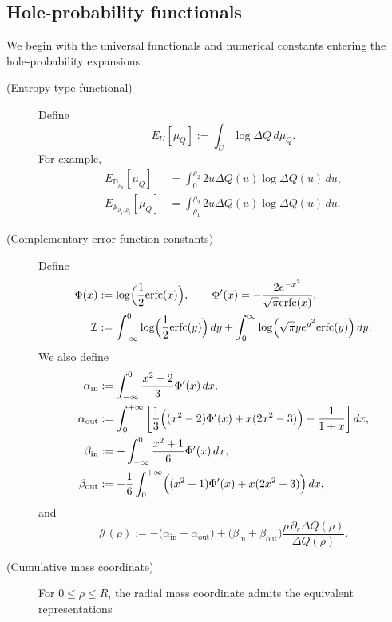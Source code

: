 \documentclass[a4paper]{article}
\newcommand{\erfc}{{\rm erfc}}
\numberwithin{equation}{section}
\begin{document}
\subsection{Hole-probability functionals}
We begin with the universal functionals and numerical constants entering the
hole-probability expansions.
\begin{description}
\item[(Entropy-type functional)] Define
\begin{equation}
    E_{U}[\mu_{Q}]:=\int_{U}\log \Delta Q\,d\mu_{Q}. 
\end{equation}
For example,
\begin{align*}
E_{\mathbb{D}_{\rho_2}}[\mu_Q]&=\int_{0}^{\rho_2}2u\Delta Q(u)\log\Delta Q(u)\,du,\\
E_{\mathbb{A}_{\rho_1,\rho_2}}[\mu_Q]&=\int_{\rho_1}^{\rho_2}2u\Delta Q(u)\log\Delta Q(u)\,du.
\end{align*}
\item[(Complementary-error-function constants)] Define
\begin{align}
    \Phi(x)&:=\log\Bigl(\frac{1}{2}\erfc(x)\Bigr),\qquad
    \Phi'(x)=-\frac{2e^{-x^2}}{\sqrt{\pi}\erfc(x)},
    \\
\mathcal{I}&:=
\int_{-\infty}^0 \log\Bigl( 
\frac{1}{2}\mathrm{erfc}(y)
\Bigr)\,dy
+
\int_{0}^{\infty}
\log\Bigl( 
\sqrt{\pi}ye^{y^2}\mathrm{erfc}(y)
\Bigr) \,dy.
\end{align}
We also define    
\begin{align}
\alpha_{\mathrm{in}}&:=\int_{-\infty}^{0}\frac{x^2-2}{3}\Phi'(x)\,dx, 
\\
\alpha_{\mathrm{out}}&:=\int_{0}^{+\infty}\bigg[
\frac{1}{3}\Bigl( 
(x^2-2)\Phi'(x)+x(2x^2-3)
\Bigr)-\frac{1}{1+x}
\bigg]\,dx, 
\\
\beta_{\mathrm{in}}&:=-\int_{-\infty}^{0}\frac{x^2+1}{6}\Phi'(x)\,dx,
\\
\beta_{\mathrm{out}}&:=-\frac{1}{6}\int_0^{+\infty}\Bigl( 
(x^2+1)\Phi'(x)+x(2x^2+3)
\Bigr)\,dx, 
\end{align}
and 
\begin{equation}
\mathcal{J}(\rho)
:=
-\bigl(\alpha_{\mathrm{in}}+\alpha_{\mathrm{out}}\bigr)
+\bigl(\beta_{\mathrm{in}}+\beta_{\mathrm{out}}\bigr)\frac{\rho\,\partial_r\Delta Q(\rho)}{\Delta Q(\rho)}. 
\end{equation}
\item[(Cumulative mass coordinate)] 
For $0\leq\rho\leq R$, the radial mass coordinate admits the equivalent representations
\begin{equation}

\end{equation}
\end{description}
\end{document}
